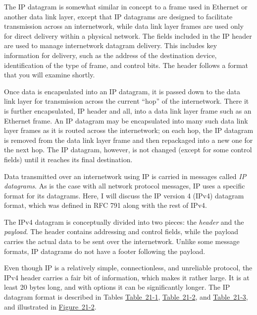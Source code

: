 The IP datagram is somewhat similar in concept to a frame used in
Ethernet or another data link layer, except that IP datagrams are
designed to facilitate transmission across an internetwork, while data
link layer frames are used only for direct delivery within a physical
network. The fields included in the IP header are used to manage
internetwork datagram delivery. This includes key information for
delivery, such as the address of the destination device, identification
of the type of frame, and control bits. The header follows a format that
you will examine shortly.

Once data is encapsulated into an IP datagram, it is passed down to the
data link layer for transmission across the current ``hop'' of the
internetwork. There it is further encapsulated, IP header and all, into
a data link layer frame such as an Ethernet frame. An IP datagram may be
encapsulated into many such data link layer frames as it is routed
across the internetwork; on each hop, the IP datagram is removed from
the data link layer frame and then repackaged into a new one for the
next hop. The IP datagram, however, is not changed (except for some
control fields) until it reaches its final destination.



Data transmitted over an internetwork using IP is carried in messages
called {\emph{IP datagrams}}. As is the case with all network protocol
messages, IP uses a specific
format for
its datagrams. Here, I will discuss the IP version 4 (IPv4) datagram
format,
which was defined in RFC 791 along with the rest of IPv4.

The IPv4 datagram is conceptually divided into two pieces: the
{\emph{header}} and the {\emph{payload}}. The header contains addressing
and control fields, while the payload carries the actual data to be sent
over the internetwork. Unlike some message formats, IP datagrams do not
have a footer following the payload.

Even though IP is a relatively simple, connectionless, and unreliable
protocol, the IPv4 header carries a fair bit of information, which makes
it rather large. It is at least 20 bytes long, and with options it can
be significantly longer. The IP datagram format is described in Tables
\protect\hyperlink{ch21s02.htmlux5cux23internet_protocol_version__ipv_datagram}{Table~21-1},
\protect\hyperlink{ch21s02.htmlux5cux23ipv_flags_subfields}{Table~21-2},
and
\protect\hyperlink{ch21s02.htmlux5cux23ipv_protocol_subfields}{Table~21-3},
and illustrated in
\protect\hyperlink{ch21s02.htmlux5cux23ipv4_datagram_format_this_diagram_shows_}{Figure~21-2}.



